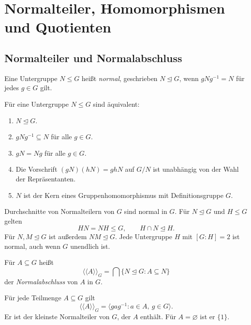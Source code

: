 \chapter{Normalteiler, Homomorphismen und Quotienten}

\section{Normalteiler und Normalabschluss}

\begin{definition}[Normalteiler]
Eine Untergruppe \(N\leq G\) heißt \emph{normal}, geschrieben
\(N\trianglelefteq G\), wenn \(gNg^{-1}=N\) für jedes \(g\in G\) gilt.
\end{definition}

\begin{theorem}[Normalitätskriterien]
Für eine Untergruppe \(N\leq G\) sind äquivalent:
\begin{enumerate}
\item \(N\trianglelefteq G\).
\item \(gNg^{-1}\subseteq N\) für alle \(g\in G\).
\item \(gN=Ng\) für alle \(g\in G\).
\item Die Vorschrift \((gN)(hN)=ghN\) auf \(G/N\)
      ist unabhängig von der Wahl der Repräsentanten.
\item \(N\) ist der Kern eines Gruppenhomomorphismus mit Definitionsgruppe \(G\).
\end{enumerate}
\cite{milne,conradquot}
\end{theorem}

\begin{theorem}
Durchschnitte von Normalteilern von \(G\) sind normal in \(G\).
Für \(N\trianglelefteq G\) und \(H\leq G\) gelten
\[
 HN=NH\leq G,\qquad H\cap N\trianglelefteq H.
\]
Für \(N,M\trianglelefteq G\) ist außerdem \(NM\trianglelefteq G\).
Jede Untergruppe \(H\) mit \([G:H]=2\) ist normal, auch wenn
\(G\) unendlich ist. \cite{milne,conradquot}
\end{theorem}

\begin{definition}[Normalabschluss]
Für \(A\subseteq G\) heißt
\[
 \langle\!\langle A\rangle\!\rangle_G
 =\bigcap\{N\trianglelefteq G:A\subseteq N\}
\]
der \emph{Normalabschluss} von \(A\) in \(G\).
\end{definition}

\begin{theorem}
Für jede Teilmenge \(A\subseteq G\) gilt
\[
 \langle\!\langle A\rangle\!\rangle_G
 =\langle gag^{-1}:a\in A,\ g\in G\rangle.
\]
Er ist der kleinste Normalteiler von \(G\), der \(A\) enthält.
Für \(A=\varnothing\) ist er \(\{1\}\). \cite{milne}
\end{theorem}

